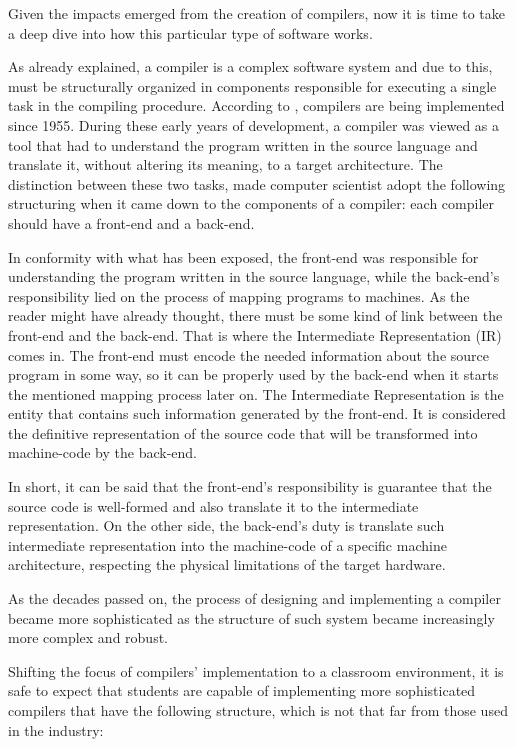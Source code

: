 Given the impacts emerged from the creation of compilers, now it is time to take a deep dive into how this particular type of software works.

As already explained, a compiler is a complex software system and due to this, must be structurally organized in components responsible for executing a single task in the compiling procedure. According to \cite{cooper2022engineering}, compilers are being implemented since 1955. During these early years of development, a compiler was viewed as a tool that had to understand the program written in the source language and translate it, without altering its meaning, to a target architecture. The distinction between these two tasks, made computer scientist adopt the following structuring when it came down to the components of a compiler: each compiler should have a front-end and a back-end. 

In conformity with what has been exposed, the front-end was responsible for understanding the program written in the source language, while the back-end's responsibility lied on the process of mapping programs to machines. As the reader might have already thought, there must be some kind of link between the front-end and the back-end. That is where the Intermediate Representation (IR) comes in. The front-end must encode the needed information about the source program in some way, so it can be properly used by the back-end when it starts the mentioned mapping process later on. The Intermediate Representation is the entity that contains such information generated by the front-end. It is considered the definitive representation of the source code that will be transformed into machine-code by the back-end.

In short, it can be said that the front-end's responsibility is guarantee that the source code is well-formed and also translate it to the intermediate representation. On the other side, the back-end's duty is translate such intermediate representation into the machine-code of a specific machine architecture, respecting the physical limitations of the target hardware.

As the decades passed on, the process of designing and implementing a compiler became more sophisticated as the structure of such system became increasingly more complex and robust.

\newpage

Shifting the focus of compilers' implementation to a classroom environment, it is safe to expect that students are capable of implementing more sophisticated compilers that have the following structure, which is not that far from those used in the industry:

